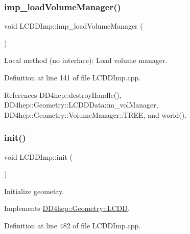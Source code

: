\subsubsection{\texorpdfstring{imp\+\_\+load\+Volume\+Manager()}{imp\_loadVolumeManager()}}
{\footnotesize\ttfamily void L\+C\+D\+D\+Imp\+::imp\+\_\+load\+Volume\+Manager (\begin{DoxyParamCaption}{ }\end{DoxyParamCaption})}



Local method (no interface)\+: Load volume manager. 



Definition at line 141 of file L\+C\+D\+D\+Imp.\+cpp.



References D\+D4hep\+::destroy\+Handle(), D\+D4hep\+::\+Geometry\+::\+L\+C\+D\+D\+Data\+::m\+\_\+vol\+Manager, D\+D4hep\+::\+Geometry\+::\+Volume\+Manager\+::\+T\+R\+EE, and world().

\hypertarget{class_d_d4hep_1_1_geometry_1_1_l_c_d_d_imp_af0cf7ab83180ee15085bcc7e1383f561}{}\label{class_d_d4hep_1_1_geometry_1_1_l_c_d_d_imp_af0cf7ab83180ee15085bcc7e1383f561} 
\subsubsection{\texorpdfstring{init()}{init()}}
{\footnotesize\ttfamily void L\+C\+D\+D\+Imp\+::init (\begin{DoxyParamCaption}{ }\end{DoxyParamCaption})\hspace{0.3cm}{\ttfamily [virtual]}}



Initialize geometry. 



Implements \hyperlink{class_d_d4hep_1_1_geometry_1_1_l_c_d_d_a9a4f55004e7375b2b20fb64e1a7ee8de}{D\+D4hep\+::\+Geometry\+::\+L\+C\+DD}.



Definition at line 482 of file L\+C\+D\+D\+Imp.\+cpp.



